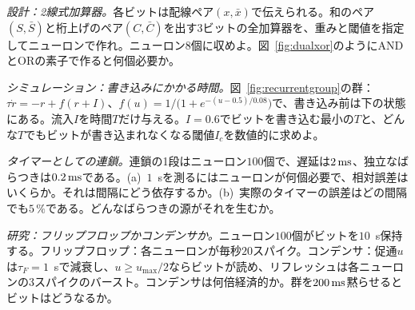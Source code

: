 \begin{exercise}[\lvlB]
\label{ex:02:4}
\emph{設計：2線式加算器。}各ビットは配線ペア$(x,\bar x)$で伝えられる。和のペア$(S,\bar S)$と桁上げのペア$(C,\bar C)$を出す3ビットの全加算器を、重みと閾値を指定してニューロンで作れ。ニューロン8個に収めよ。図~\ref{fig:dualxor}のようにANDとORの素子で作ると何個必要か。
\end{exercise}

\begin{exercise}[\lvlB]
\label{ex:02:5}
\emph{シミュレーション：書き込みにかかる時間。}図~\ref{fig:recurrentgroup}の群：$\tau\dot r=-r+f(r+I)$、$f(u)=1/\bigl(1+e^{-(u-0.5)/0.08}\bigr)$で、書き込み前は下の状態にある。流入$I$を時間$T$だけ与える。$I=0.6$でビットを書き込む最小の$T$と、どんな$T$でもビットが書き込まれなくなる閾値$I_c$を数値的に求めよ。
\end{exercise}

\begin{exercise}[\lvlA]
\label{ex:02:6}
\emph{タイマーとしての連鎖。}連鎖の1段はニューロン$100$個で、遅延は$2\,\text{ms}$、独立なばらつきは$0.2\,\text{ms}$である。(a)~$1$~sを測るにはニューロンが何個必要で、相対誤差はいくらか。それは間隔にどう依存するか。(b)~実際のタイマーの誤差はどの間隔でも$5\,\%$である。どんなばらつきの源がそれを生むか。
\end{exercise}

\begin{exercise}[\lvlC]
\label{ex:02:7}
\emph{研究：フリップフロップかコンデンサか。}ニューロン$100$個がビットを$10$~s保持する。フリップフロップ：各ニューロンが毎秒$20$スパイク。コンデンサ：促通$u$は$\tau_F=1$~sで減衰し、$u\ge u_{\max}/2$ならビットが読め、リフレッシュは各ニューロンの3スパイクのバースト。コンデンサは何倍経済的か。群を$200\,\text{ms}$黙らせるとビットはどうなるか。
\end{exercise}
